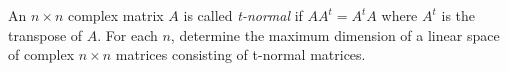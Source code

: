 An \(n \times n\) complex matrix \(A\) is called \emph{t-normal} if
\(AA^t = A^t A\) where \(A^t\) is the transpose of \(A\).  For each \(n\),
determine the maximum dimension of a linear space of complex $n
\times n$ matrices consisting of t-normal matrices.